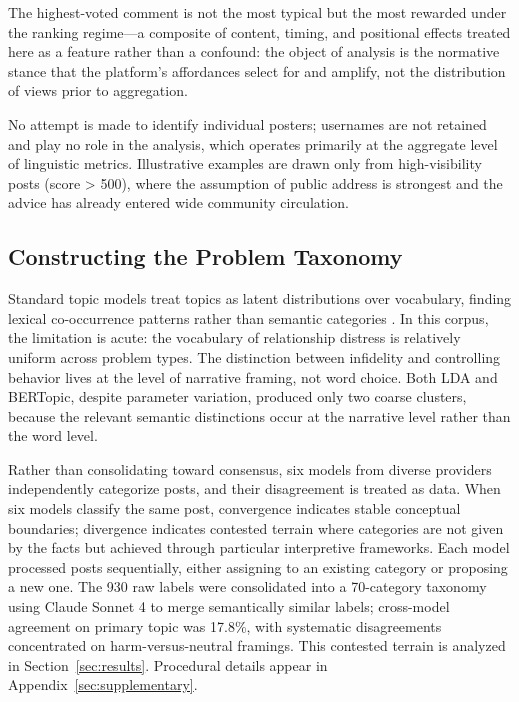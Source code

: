 The highest-voted comment is not the most typical but the most rewarded under the ranking regime---a composite of content, timing, and positional effects treated here as a feature rather than a confound: the object of analysis is the normative stance that the platform's affordances select for and amplify, not the distribution of views prior to aggregation.

No attempt is made to identify individual posters; usernames are not retained and play no role in the analysis, which operates primarily at the aggregate level of linguistic metrics. Illustrative examples are drawn only from high-visibility posts (score > 500), where the assumption of public address is strongest and the advice has already entered wide community circulation.

\subsection{Constructing the Problem Taxonomy}

Standard topic models treat topics as latent distributions over vocabulary, finding lexical co-occurrence patterns rather than semantic categories \citep{Grimmer_Stewart_2013}. In this corpus, the limitation is acute: the vocabulary of relationship distress is relatively uniform across problem types. The distinction between infidelity and controlling behavior lives at the level of narrative framing, not word choice. Both LDA and BERTopic, despite parameter variation, produced only two coarse clusters, because the relevant semantic distinctions occur at the narrative level rather than the word level.

Rather than consolidating toward consensus, six models from diverse providers independently categorize posts, and their disagreement is treated as data. When six models classify the same post, convergence indicates stable conceptual boundaries; divergence indicates contested terrain where categories are not given by the facts but achieved through particular interpretive frameworks. Each model processed posts sequentially, either assigning to an existing category or proposing a new one. The 930 raw labels were consolidated into a 70-category taxonomy using Claude Sonnet 4 to merge semantically similar labels; cross-model agreement on primary topic was 17.8\%, with systematic disagreements concentrated on harm-versus-neutral framings. This contested terrain is analyzed in Section~\ref{sec:results}. Procedural details appear in Appendix~\ref{sec:supplementary}.

